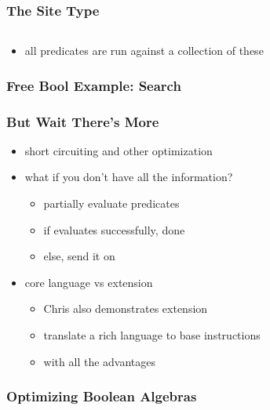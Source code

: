 \documentclass{beamer}
\begin{document}
\begin{frame}
  \frametitle{The Site Type}
  \inputminted{scala}{snippets/site-type.scala}
  \begin{itemize}
  \item all predicates are run against a collection of these
  \end{itemize}
\end{frame}

\begin{frame}
  \frametitle{Free Bool Example: Search}
\end{frame}

\begin{frame}
  \frametitle{But Wait There's More}
  \begin{itemize}
  \item short circuiting and other optimization
  \item what if you don't have all the information?
    \begin{itemize}
    \item partially evaluate predicates
    \item if evaluates successfully, done
    \item else, send it on
    \end{itemize}
  \item core language vs extension
    \begin{itemize}
    \item Chris also demonstrates extension
    \item translate a rich language to base instructions
    \item with all the advantages
    \end{itemize}
  \end{itemize}
\end{frame}

\begin{frame}
  \frametitle{Optimizing Boolean Algebras}
  \inputminted{scala}{snippets/optimizing-boolean-algebras.scala}
\end{frame}
\end{document}
